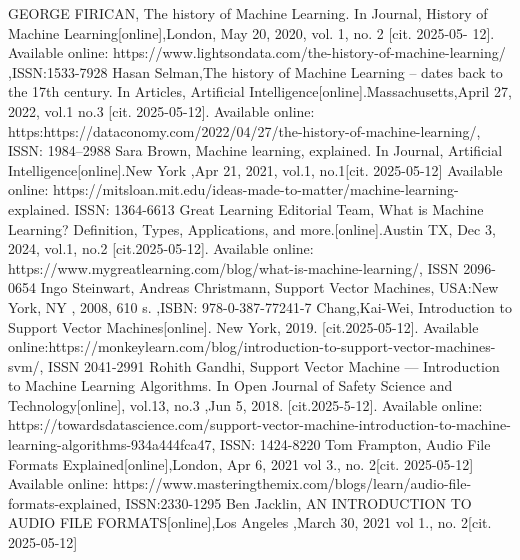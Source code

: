 \documentclass[english,12pt,oneside,a4paper]{article}
\begin{document}
	\begin{thebibliography}{15}
		GEORGE FIRICAN, The history of Machine Learning. In Journal, History of Machine Learning[online],London,  May 20, 2020, vol. 1, no. 2 [cit. 2025-05-
		12]. Available online: https://www.lightsondata.com/the-history-of-machine-learning/ ,ISSN:1533-7928
		Hasan Selman,The history of Machine Learning – dates back to the 17th century. In Articles, Artificial Intelligence[online].Massachusetts,April 27, 2022, vol.1 no.3 [cit. 2025-05-12]. Available online: https:https://dataconomy.com/2022/04/27/the-history-of-machine-learning/, ISSN: 1984–2988
		Sara Brown, Machine learning, explained. In Journal, Artificial Intelligence[online].New York ,Apr 21, 2021, vol.1, no.1[cit. 2025-05-12]
		Available online: https://mitsloan.mit.edu/ideas-made-to-matter/machine-learning-explained. ISSN: 1364-6613
		Great Learning Editorial Team, What is Machine Learning? Definition, Types, Applications, and more.[online].Austin TX, Dec 3, 2024, vol.1, no.2 [cit.2025-05-12]. Available online: https://www.mygreatlearning.com/blog/what-is-machine-learning/, ISSN 2096-0654
		Ingo Steinwart, Andreas Christmann, Support Vector Machines, USA:New York, NY , 2008, 610 s. ,ISBN: 978-0-387-77241-7
		Chang,Kai-Wei, Introduction to Support Vector Machines[online]. New York, 2019. [cit.2025-05-12].
		Available online:https://monkeylearn.com/blog/introduction-to-support-vector-machines-svm/, ISSN 2041-2991
		Rohith Gandhi, Support Vector Machine — Introduction to Machine Learning Algorithms. In Open Journal of Safety Science and Technology[online], vol.13, no.3 ,Jun 5, 2018. [cit.2025-5-12].
		Available online: https://towardsdatascience.com/support-vector-machine-introduction-to-machine-learning-algorithms-934a444fca47, ISSN: 1424-8220
		Tom Frampton, Audio File Formats Explained[online],London, Apr 6, 2021 vol 3., no. 2[cit. 2025-05-12]
		Available online:
		https://www.masteringthemix.com/blogs/learn/audio-file-formats-explained, ISSN:2330-1295
		Ben Jacklin, AN INTRODUCTION TO AUDIO FILE FORMATS[online],Los Angeles ,March 30, 2021 vol 1., no. 2[cit. 2025-05-12]

\end{thebibliography}
\end{document}

